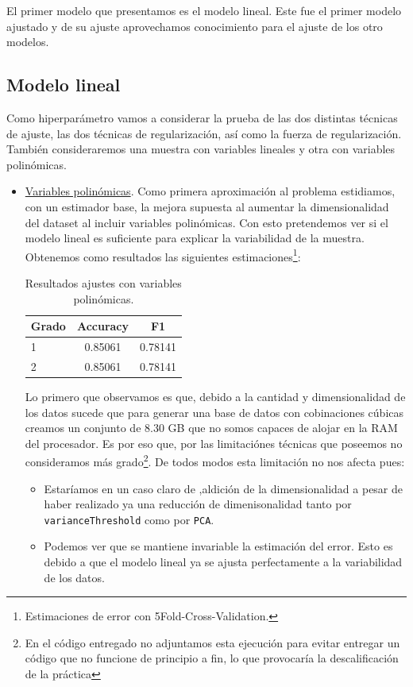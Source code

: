 \documentclass[11pt,a4paper]{article}
\begin{document}
 
 El primer modelo que presentamos es el modelo lineal. Este fue el primer modelo ajustado y de su ajuste aprovechamos conocimiento para el ajuste de los otro modelos. 
 
\subsection{Modelo lineal}
Como hiperparámetro vamos a considerar la prueba de las dos distintas técnicas de ajuste, las dos técnicas de regularización, así como la fuerza de regularización. También consideraremos una muestra con variables lineales y otra con variables polinómicas. \\



\begin{itemize}
\item \underline{Variables polinómicas}. Como primera aproximación al problema estidiamos, con un estimador base, la mejora supuesta al aumentar la dimensionalidad del dataset al incluir variables polinómicas. Con esto pretendemos ver si el modelo lineal es suficiente para explicar la variabilidad de la muestra. Obtenemos como resultados las siguientes estimaciones\footnote{Estimaciones de error con  5Fold-Cross-Validation.}:

\begin{table}[h]
\begin{center}
\begin{tabular}{|l|c|c|}
\hline
	Grado & Accuracy & F1 \\ \hline
1 & 0.85061 & 0.78141 \\
2 & 0.85061 & 0.78141  \\\hline
\end{tabular}
\caption{Resultados ajustes con variables polinómicas.}

\end{center}
\end{table}

Lo primero que observamos es que, debido a la cantidad y dimensionalidad de los datos sucede que para generar una base de datos con cobinaciones cúbicas creamos un conjunto de 8.30 GB que no somos capaces de alojar en la RAM del procesador. Es por eso que, por las limitaciónes técnicas que poseemos no consideramos más grado\footnote{En el código entregado no adjuntamos esta ejecución para evitar entregar un código que no funcione de principio a fin, lo que provocaría la descalificación de la práctica}. De todos modos esta limitación no nos afecta pues:
\begin{itemize}
	\item Estaríamos en un caso claro de ,aldición de la dimensionalidad\cite{maldim} a pesar de haber realizado ya una reducción de dimenisonalidad tanto por \texttt{varianceThreshold} como por \texttt{PCA}.
	\item Podemos ver que se mantiene invariable la estimación del error. Esto es debido a que el modelo lineal ya se ajusta perfectamente a la variabilidad de los datos. 
\end{itemize}


\end{itemize}
\end{document}
